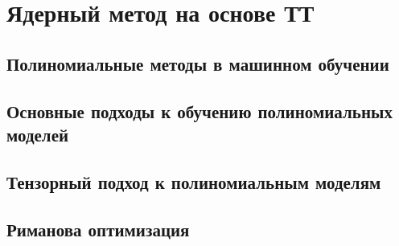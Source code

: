 \chapter{Ядерный метод на основе ТТ} \label{chap:exm}
\section{Полиномиальные методы в машинном обучении} \label{sec:polynomial-ml}
\section{Основные подходы к обучению полиномиальных моделей} \label{sec:polynomial-ml-approaches}
\section{Тензорный подход к полиномиальным моделям} \label{sec:exm}
\section{Риманова оптимизация} \label{sec:riemannian-exm}
